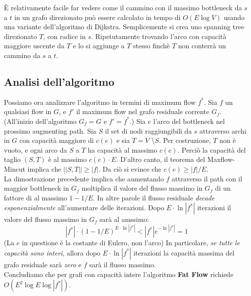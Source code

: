 È relativamente facile far vedere come il cammino con il massimo bottleneck da $s$ a $t$ in un grafo direzionato può essere calcolato in tempo di $O(E\log{V})$ usando una variante dell'algoritmo di Dijkstra. Semplicemente si crea uno spanning tree direzionato $T$, con radice in $s$. Ripetutamente trovando l'arco con capacità maggiore uscente da $T$ e lo si aggiunge a $T$ stesso finchè $T$ non conterrà un cammino da $s$ a $t$.

\subsection{Analisi dell'algoritmo}

Possiamo ora analizzare l'algoritmo in termini di maximum flow $f^{*}$. Sia $f$ un qualsiasi flow in $G$, e $f'$ il maximum flow nel grafo residuale corrente $G_f$. (All'inizio dell'algoritmo $G_f = G$ e $f' = f^{*}$.)
Sia $e$ l'arco del bottleneck nel prossimo augmenting path. Sia $S$ il set di nodi raggiungibili da $s$ attraverso archi in $G$ con capacità maggiore di $c(e)$ e sia $T = V$ \textbackslash $S$. Per costruzione, $T$ non è vuoto, e ogni arco da $S$ a $T$ ha capacità al massimo $c(e)$. Perciò la capacità del taglio $(S,T)$ è al massimo $c(e) \cdot E$. D'altro canto, il teorema del Maxflow-Mincut implica che $||S,T|| \geq |f|$. Da ciò si evince che $c(e) \geq |f|/E$.\\

La dimostrazione precedente implica che aumentando $f$ attraverso il path con il maggior bottleneck in $G_f$ moltiplica il valore del flusso massimo in $G_f$ di un fattore di al massimo $1 - 1/E$. In altre parole il flusso residuale \textit{decade esponenzialmente} all'aumentare delle iterazioni. Dopo $E \cdot \ln{|f^{*}|}$ iterazioni il valore del flusso massimo in $G_f$ sarà al amssimo:
$$
    |f^{*}|\cdot(1-1/E)^{E\cdot \ln{|f^{*}|}} < |f^{*}|e^{-\ln{|f^{*}|}} = 1
$$
(La $e$ in questione è la costante di Eulero, non l'arco) In particolare, \textit{se tutte le capacità sono interi}, allora dopo $E\cdot \ln{|f^{*}|}$ iterazioni la capacità massima del grafo residuale sarà \textit{zero} e $f$ sarà il flusso massimo.\\

Concludiamo che per grafi con capacità intere l'algoritmo \textbf{Fat Flow} richiede $O(E^2\log{E}\log{|f^{*}|})$.